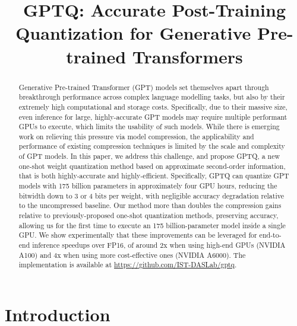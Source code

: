 \title{GPTQ:  Accurate Post-Training Quantization for Generative Pre-trained Transformers}



\maketitle

\begin{abstract}
Generative Pre-trained Transformer (GPT) models set themselves apart through breakthrough performance across  complex language modelling tasks, but also by their extremely high computational and storage costs. Specifically, due to their massive size, even inference for large, highly-accurate GPT models may require multiple performant GPUs to execute, which limits the usability of such models. While there is emerging work on relieving this pressure via model compression, the applicability and performance of existing compression techniques is limited by the scale and complexity of GPT models. In this paper, we address this challenge, and propose GPTQ, a new one-shot weight quantization method based on approximate second-order information, that is both highly-accurate and highly-efficient. Specifically, GPTQ can quantize GPT models with 175 billion parameters in approximately four GPU hours, reducing the bitwidth down to 3 or 4 bits per weight, with negligible accuracy degradation relative to the uncompressed baseline. Our method more than doubles the compression gains relative to previously-proposed one-shot quantization methods, preserving accuracy, allowing us for the first time to execute an 175 billion-parameter model inside a single GPU. We show experimentally that these improvements can be leveraged for end-to-end inference speedups over FP16, of around 2x when using high-end GPUs (NVIDIA A100) and 4x when using more cost-effective ones (NVIDIA A6000). The implementation is available at \url{https://github.com/IST-DASLab/gptq}.
\end{abstract}

\section{Introduction}

